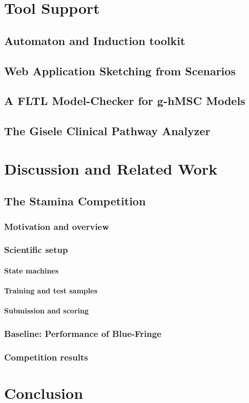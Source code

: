 \documentclass[dvips,a4paper,11pt]{report}
\begin{document}
\chapter{Tool Support}
  \section{Automaton and Induction toolkit}
  \section{Web Application Sketching from Scenarios}
  \section{A FLTL Model-Checker for g-hMSC Models}
  \section{The Gisele Clinical Pathway Analyzer}
\chapter{Discussion and Related Work}
  \section{The Stamina Competition\label{section_stamina}}
    \subsection{Motivation and overview\label{subsection_stamina_overview}}
    \subsection{Scientific setup\label{subsection_stamina_setup}}
      \subsubsection*{State machines}
      \subsubsection*{Training and test samples}
      \subsubsection*{Submission and scoring}
    \subsection{Baseline: Performance of Blue-Fringe\label{subsection_stamina_baseline}}
    \subsection{Competition results\label{subsection_stamina_results}}
\chapter{Conclusion}


\end{document}
